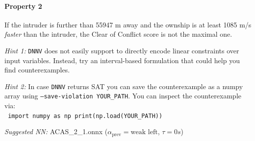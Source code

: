 \documentclass[11pt,fleqn]{article}
\begin{document}
\paragraph*{Property 2}
If the intruder is further than 55947 m away and the ownship is at least 1085 m/s \emph{faster}
than the intruder, the Clear of Conflict score is not the maximal one.

\textit{Hint 1:}
\texttt{DNNV} does not easily support to directly encode linear constraints over input variables.
Instead, try an interval-based formulation that could help you find counterexamples.

\textit{Hint 2:}
In case \texttt{DNNV} returns SAT you can save the counterexample as a numpy array using \texttt{--save-violation YOUR\_PATH}.
You can inspect the counterexample via:\\
\texttt{
import numpy as np
print(np.load(YOUR\_PATH))
}

\textit{Suggested NN:} ACAS\_2\_1.onnx ($\alpha_{\text{prev}}=\text{weak left}$, $\tau=0s$)







\end{document}
